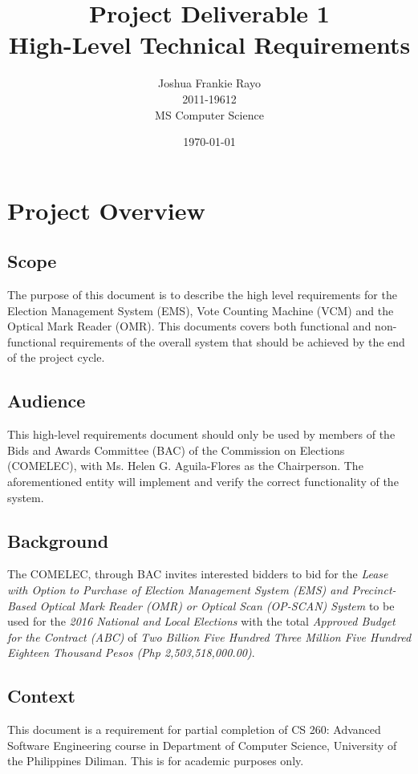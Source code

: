 \documentclass[a4paper, 11pt]{article}
\title{Project Deliverable 1\\ High-Level Technical Requirements}
\author{Joshua Frankie Rayo\\ 2011-19612\\ MS Computer Science}
\date{\today}
\begin{document}
\maketitle
\tableofcontents
\listoffigures

\section{Project Overview}
\subsection{Scope}
The purpose of this document is to describe the high level requirements for the Election Management System (EMS), Vote Counting Machine (VCM) and the Optical Mark Reader (OMR).
This documents covers both functional and non-functional requirements of the overall system that should be achieved by the end of the project cycle.

\subsection{Audience}
This high-level requirements document should only be used by members of the Bids and Awards Committee (BAC) of the Commission on Elections (COMELEC), with Ms. Helen G. Aguila-Flores as the Chairperson.
The aforementioned entity will implement and verify the correct functionality of the system.

\subsection{Background}
The COMELEC, through BAC invites interested bidders to bid for the \textit{Lease with Option to Purchase of Election Management System (EMS) and Precinct-Based Optical Mark Reader (OMR) or Optical Scan (OP-SCAN) System} to be used for the \textit{2016 National and Local Elections} with the total \textit{Approved Budget for the Contract (ABC)} of \textit{Two Billion Five Hundred Three Million Five Hundred Eighteen Thousand Pesos (Php 2,503,518,000.00)}.

\subsection{Context}
This document is a requirement for partial completion of CS 260: Advanced Software Engineering course in Department of Computer Science, University of the Philippines Diliman.
This is for academic purposes only.
\end{document}
